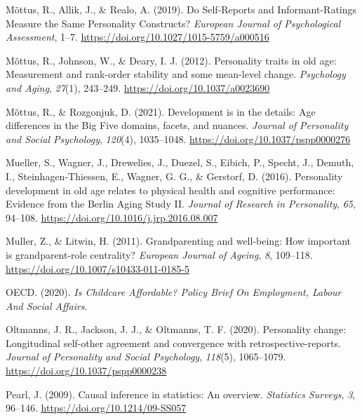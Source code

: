 \documentclass[
  english,
  man, noextraspace]{apa7}
\begin{document}
\leavevmode\hypertarget{ref-mottusSelfReportsInformantRatingsMeasure2019}{}%
Mõttus, R., Allik, J., \& Realo, A. (2019). Do Self-Reports and Informant-Ratings Measure the Same Personality Constructs? \emph{European Journal of Psychological Assessment}, 1--7. \url{https://doi.org/10.1027/1015-5759/a000516}

\leavevmode\hypertarget{ref-mottusPersonalityTraitsOld2012}{}%
Mõttus, R., Johnson, W., \& Deary, I. J. (2012). Personality traits in old age: Measurement and rank-order stability and some mean-level change. \emph{Psychology and Aging}, \emph{27}(1), 243--249. \url{https://doi.org/10.1037/a0023690}

\leavevmode\hypertarget{ref-mottusDevelopmentDetailsAge2021}{}%
Mõttus, R., \& Rozgonjuk, D. (2021). Development is in the details: Age differences in the Big Five domains, facets, and nuances. \emph{Journal of Personality and Social Psychology}, \emph{120}(4), 1035--1048. \url{https://doi.org/10.1037/pspp0000276}

\leavevmode\hypertarget{ref-muellerPersonalityDevelopmentOld2016}{}%
Mueller, S., Wagner, J., Drewelies, J., Duezel, S., Eibich, P., Specht, J., Demuth, I., Steinhagen-Thiessen, E., Wagner, G. G., \& Gerstorf, D. (2016). Personality development in old age relates to physical health and cognitive performance: Evidence from the Berlin Aging Study II. \emph{Journal of Research in Personality}, \emph{65}, 94--108. \url{https://doi.org/10.1016/j.jrp.2016.08.007}

\leavevmode\hypertarget{ref-mullerGrandparentingWellbeingHow2011}{}%
Muller, Z., \& Litwin, H. (2011). Grandparenting and well-being: How important is grandparent-role centrality? \emph{European Journal of Ageing}, \emph{8}, 109--118. \url{https://doi.org/10.1007/s10433-011-0185-5}

\leavevmode\hypertarget{ref-oecdChildcareAffordablePolicy2020}{}%
OECD. (2020). \emph{Is Childcare Affordable? Policy Brief On Employment, Labour And Social Affairs}.

\leavevmode\hypertarget{ref-oltmannsPersonalityChangeLongitudinal2020}{}%
Oltmanns, J. R., Jackson, J. J., \& Oltmanns, T. F. (2020). Personality change: Longitudinal self-other agreement and convergence with retrospective-reports. \emph{Journal of Personality and Social Psychology}, \emph{118}(5), 1065--1079. \url{https://doi.org/10.1037/pspp0000238}

\leavevmode\hypertarget{ref-pearlCausalInferenceStatistics2009}{}%
Pearl, J. (2009). Causal inference in statistics: An overview. \emph{Statistics Surveys}, \emph{3}, 96--146. \url{https://doi.org/10.1214/09-SS057}
\end{document}
